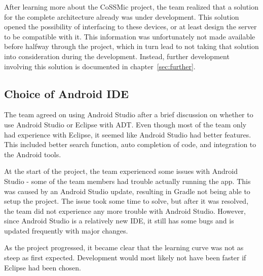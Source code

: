 After learning more about the CoSSMic project, the team realized that a solution for the complete architecture already was under development. This solution opened the possibility of interfacing to these devices, or at least design the server to be compatible with it. This information was unfortunately not made available before halfway through the project, which in turn lead to not taking that solution into consideration during the development. Instead, further development involving this solution is documented in chapter~\ref{sec:further}.

\subsection{Choice of Android IDE}
The team agreed on using Android Studio after a brief discussion on whether to use Android Studio or Eclipse with ADT. Even though most of the team only had experience with Eclipse, it seemed like Android Studio had better features. This included better search function, auto completion of code, and integration to the Android tools.
 
At the start of the project, the team experienced some issues with Android Studio - some of the team members had trouble actually running the app. This was caused by an Android Studio update, resulting in Gradle not being able to setup the project. The issue took some time to solve, but after it was resolved, the team did not experience any more trouble with Android Studio. However, since Android Studio is a relatively new IDE, it still has some bugs and is updated frequently with major changes.

As the project progressed, it became clear that the learning curve was not as steep as first expected. Development would most likely not have been faster if Eclipse had been chosen.
